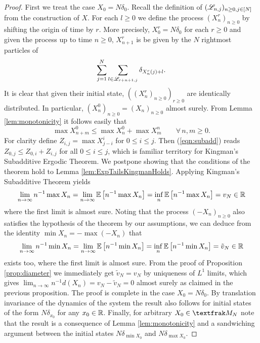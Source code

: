 \begin{proof}
First we treat the case $X_0 = N \delta_0$. Recall the definition of $(\mathscr{L}_{n, j})_{n \geq 0, j \in [N]}$ from the construction of $X$. For each $l \geq 0$ we define the process $(X^r_n)_{n \geq 0}$ by shifting the origin of time by $r$. More precisely, $X^r_0 = N \delta_0$ for each $r \geq 0$ and given the process up to time $n \geq 0$, $X^r_{n+1}$ is be given by the $N$ rightmost particles of 
\begin{equation}\nonumber
\sum_{j = 1}^N \sum_{l \in \mathscr{L}_{r + n + 1, j}} \delta_{X^r_n(j) + l}. 
\end{equation}
It is clear that given their initial state, $((X^r_n)_{n \geq 0})_{r \geq 0}$ are identically distributed. In particular, $(X^0_n)_{n \geq 0} = (X_n)_{n \geq 0}$ almost surely. From Lemma \ref{lem:monotonicity} it follows easily that 
\begin{equation}\label{eqn:subadd}
\max X^0_{n + m} \leq \max X^0_n + \max X^n_m \qquad \forall\, n,m \geq 0. 
\end{equation}
For clarity define $Z_{i,j} = \max X^i_{j - i}$ for $0 \leq i \leq j$. Then (\ref{eqn:subadd}) reads $Z_{0, j} \leq Z_{0,i} + Z_{i,j}$ for all $0 \leq i \leq j$, which is familiar territory for Kingman's Subadditive Ergodic Theorem. We postpone showing that the conditions of the theorem hold to Lemma \ref{lem:ExpTailsKingmanHolds}. Applying Kingman's Subadditive Theorem yields 
\begin{equation}\nonumber
\lim_{n \to \infty} n^{-1} \max X_n = \lim_{n \to \infty} \mathbb{E}\left[ n^{-1} \max X_n \right] = \inf_n \mathbb{E}\left[ n^{-1} \max X_n \right] = v_N \in \mathbb{R}
\end{equation}
where the first limit is almost sure. Noting that the process $(-X_n)_{n \geq 0}$ also satisfies the hypothesis of the theorem by our assumptions, we can deduce from the identity $\min X_n = - \max (-X_n)$ that 
\begin{equation}\nonumber
\lim_{n \to \infty} n^{-1} \min X_n = \lim_{n \to \infty} \mathbb{E}\left[ n^{-1} \min X_n \right] = \inf_n \mathbb{E}\left[ n^{-1} \min X_n \right] = \tilde{v}_N \in \mathbb{R}
\end{equation}
exists too, where the first limit is almost sure. From the proof of Proposition \ref{prop:diameter} we immediately get $\tilde{v}_N = v_N$ by uniqueness of $L^1$ limits, which gives $\lim_{n\to\infty} n^{-1}d(X_n) = v_N - \tilde{v}_N = 0$ almost surely as claimed in the previous proposition. The proof is complete in the case $X_0 = N \delta_0$. By translation invariance of the dynamics of the system the result also follows for initial states of the form $N \delta_{x_0}$ for any $x_0 \in \mathbb{R}$. Finally, for arbitrary $X_0 \in \frak{M}_N$ note that the result is a consequence of Lemma \ref{lem:monotonicity} and a sandwiching argument between the initial states $N \delta_{\min X_0}$ and $N \delta_{\max X_0}$. 
\end{proof}

